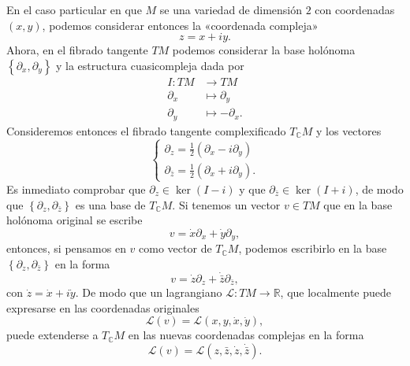 \documentclass[12pt,a4paper,twoside]{article}
\theoremstyle{definition} \newtheorem{defn}[thm]{Definición}
\theoremstyle{definition} \newtheorem{ejemplo}[thm]{Ejemplo}
\theoremstyle{definition} \newtheorem{ejercicio}[thm]{Ejercicio}
\theoremstyle{remark} \newtheorem*{obs}{Observación}
\def\CC{\mathbb{C}}
\def\RR{\mathbb{R}}
\begin{document}
   En el caso particular en que $M$ se una variedad de dimensión $2$ con coordenadas $(x,y)$, podemos considerar entonces la «coordenada compleja» 
   \begin{equation*}
     z=x+iy.
   \end{equation*}
   Ahora, en el fibrado tangente $TM$ podemos considerar la base holónoma $\left\{ \partial_x, \partial_y \right\}$ y la estructura cuasicompleja dada por
   \begin{align*}
     I :TM&\longrightarrow TM\\ 
       \partial_x &\longmapsto \partial_y \\
       \partial_y &\longmapsto -\partial_x .
     \end{align*}
     Consideremos entonces el fibrado tangente complexificado $T_{\CC}M$ y los vectores
     \begin{equation}
       \begin{cases}
	 \partial_z=\tfrac{1}{2}(\partial_x-i\partial_y) \\
	 \partial_{\bar{z}}=\tfrac{1}{2}(\partial_x+i\partial_y) .
       \end{cases}
     \end{equation}
     Es inmediato comprobar que 
	 $\partial_z\in \ker(I-i)$ y que
	 $\partial_{\bar{z}} \in \ker(I+i)$,
	 de modo que $\left\{ \partial_z, \partial_{\bar{z}} \right\}$ es una base de $T_{\CC}M$. Si tenemos un vector $v \in TM$ que en la base holónoma original se escribe
     \begin{equation}
       v = \dot{x} \partial_x + \dot{y} \partial_y,
     \end{equation}
     entonces, si pensamos en $v$ como vector de $T_{\CC}M$, podemos escribirlo en la base $\left\{ \partial_z, \partial_{\bar{z}} \right\}$ en la forma
     \begin{equation}
       v= \dot{z} \partial_z + \dot{\bar{z}} \partial_{\bar{z}},
     \end{equation}
     con $\dot{z}=\dot{x} + i \dot{y}$. De modo que un lagrangiano $\mathcal{L}:TM\rightarrow \RR$, que localmente puede expresarse en las coordenadas originales
     \begin{equation}
       \mathcal{L}(v)=\mathcal{L}(x,y,\dot{x},\dot{y}),
     \end{equation}
     puede extenderse a $T_{\CC}M$ en las nuevas coordenadas complejas en la forma
     \begin{equation}
       \mathcal{L} (v)=\mathcal{L}(z,\bar{z},\dot{z},\dot{\bar{z}}).
     \end{equation}
\end{document}
